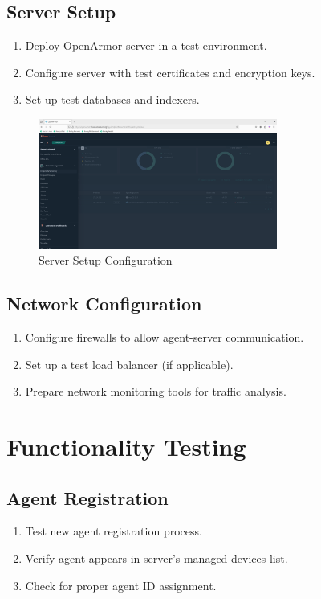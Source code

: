 \subsection{Server Setup}
\begin{enumerate}
    \item Deploy OpenArmor server in a test environment.
    \item Configure server with test certificates and encryption keys.
    \item Set up test databases and indexers.
\end{enumerate}

\begin{figure}[h]
    \centering
    \includegraphics[width=0.7\textwidth]{openarmor-agent/3.png}
    \caption{Server Setup Configuration}
    \label{fig:server-setup}
\end{figure}

\subsection{Network Configuration}
\begin{enumerate}
    \item Configure firewalls to allow agent-server communication.
    \item Set up a test load balancer (if applicable).
    \item Prepare network monitoring tools for traffic analysis.
\end{enumerate}

\section{Functionality Testing}
\subsection{Agent Registration}
\begin{enumerate}
    \item Test new agent registration process.
    \item Verify agent appears in server's managed devices list.
    \item Check for proper agent ID assignment.
\end{enumerate}

